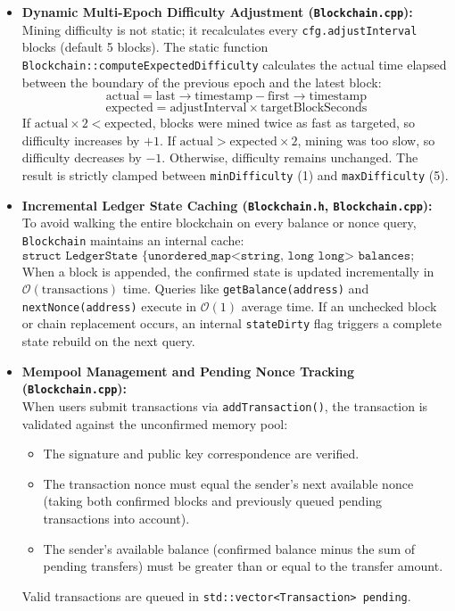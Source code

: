 \documentclass[11pt,a4paper]{report}
\begin{document}
\begin{itemize}
    \item \textbf{Dynamic Multi-Epoch Difficulty Adjustment (\texttt{Blockchain.cpp}):}\\
    Mining difficulty is not static; it recalculates every \texttt{cfg.adjustInterval} blocks (default 5 blocks). The static function \texttt{Blockchain::computeExpectedDifficulty} calculates the actual time elapsed between the boundary of the previous epoch and the latest block:
    \begin{equation}
        \text{actual} = \text{last}\to\text{timestamp} - \text{first}\to\text{timestamp}
    \end{equation}
    \begin{equation}
        \text{expected} = \text{adjustInterval} \times \text{targetBlockSeconds}
    \end{equation}
    If $\text{actual} \times 2 < \text{expected}$, blocks were mined twice as fast as targeted, so difficulty increases by $+1$. If $\text{actual} > \text{expected} \times 2$, mining was too slow, so difficulty decreases by $-1$. Otherwise, difficulty remains unchanged. The result is strictly clamped between \texttt{minDifficulty} (1) and \texttt{maxDifficulty} (5).

    \item \textbf{Incremental Ledger State Caching (\texttt{Blockchain.h}, \texttt{Blockchain.cpp}):}\\
    To avoid walking the entire blockchain on every balance or nonce query, \texttt{Blockchain} maintains an internal cache:
    \begin{equation*}
        \texttt{struct LedgerState \{ unordered\_map<string, long long> balances; unordered\_map<string, long long> lastNonce; \}}
    \end{equation*}
    When a block is appended, the confirmed state is updated incrementally in $\mathcal{O}(\text{transactions})$ time. Queries like \texttt{getBalance(address)} and \texttt{nextNonce(address)} execute in $\mathcal{O}(1)$ average time. If an unchecked block or chain replacement occurs, an internal \texttt{stateDirty} flag triggers a complete state rebuild on the next query.

    \item \textbf{Mempool Management and Pending Nonce Tracking (\texttt{Blockchain.cpp}):}\\
    When users submit transactions via \texttt{addTransaction()}, the transaction is validated against the unconfirmed memory pool:
    \begin{itemize}
        \item The signature and public key correspondence are verified.
        \item The transaction nonce must equal the sender's next available nonce (taking both confirmed blocks and previously queued pending transactions into account).
        \item The sender's available balance (confirmed balance minus the sum of pending transfers) must be greater than or equal to the transfer amount.
    \end{itemize}
    Valid transactions are queued in \texttt{std::vector<Transaction> pending}.


\end{itemize}
\end{document}
